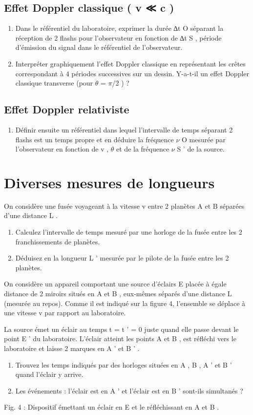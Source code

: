 \subsection{Effet Doppler classique ( v ≪ c )}
\begin{enumerate}
  \item Dans le référentiel du laboratoire, exprimer la durée ∆t O séparant la réception de 2 flashs
pour l'observateur en fonction de ∆t S , période d'émission du signal dans le référentiel de
l'observateur.
  \item Interpréter graphiquement l'effet Doppler classique en représentant les crêtes correspondant
à 4 périodes successives sur un dessin. Y-a-t-il un effet Doppler classique transverse (pour
$\theta$ = $\pi$/2 ) ?
\setcounter{numero}{\theenumi}\end{enumerate}
\subsection{Effet Doppler relativiste}
\begin{enumerate}
  \setcounter{enumi}{\thenumero}
  \item Définir ensuite un référentiel dans lequel l'intervalle de temps séparant 2 flashs est un temps
propre et en déduire la fréquence $\nu$ O mesurée par l'observateur en fonction de v , $\theta$ et de la
fréquence $\nu$ S ' de la source.
\end{enumerate} 
\section{Diverses mesures de longueurs}
On considère une fusée voyageant à la vitesse v entre 2 planètes A et B séparées d'une distance L .
\begin{enumerate}
  \item Calculez l'intervalle de temps mesuré par une horloge de la fusée entre les 2 franchissements
de planètes.
  \item Déduisez en la longueur L ' mesurée par le pilote de la fusée entre les 2 planètes.
\setcounter{numero}{\theenumi}\end{enumerate}
On considère un appareil comportant une source d'éclairs E placée à égale distance de 2 miroirs
situés en A et B , eux-mêmes séparés d'une distance L (mesurée au repos). Comme il est indiqué
sur la figure 4, l'ensemble se déplace à une vitesse v par rapport au laboratoire.

La source émet un éclair au temps t = t ' = 0 juste quand elle passe devant le point E ' du
laboratoire. L'éclair atteint les points A et B , est réfléchi vers le laboratoire et laisse 2 marques
en A ' et B ' .
\begin{enumerate}
  \setcounter{enumi}{\thenumero}
  \item Trouvez les temps indiqués par des horloges situées en A , B , A ' et B ' quand l'éclair y arrive.
  \item Les événements : l'éclair est en A ' et l'éclair est en B ' sont-ils simultanés ?
\end{enumerate} 
Fig. 4 : Dispositif émettant un éclair en E et le réfléchissant en A et B .
